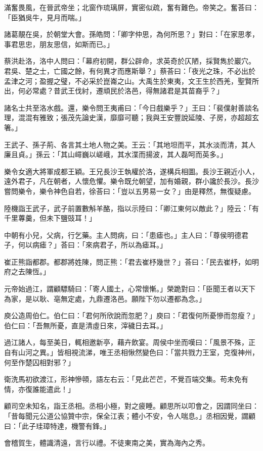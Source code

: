 滿奮畏風，在晉武帝坐；北窗作琉璃屏，實密似疏，奮有難色。帝笑之。奮荅曰：「臣猶吳牛，見月而喘。」

諸葛靚在吳，於朝堂大會。孫皓問：「卿字仲思，為何所思？」對曰：「在家思孝，事君思忠，朋友思信，如斯而已。」

蔡洪赴洛，洛中人問曰：「幕府初開，群公辟命，求英奇於仄陋，採賢雋於巖穴。君吳、楚之士，亡國之餘，有何異才而應斯舉？」蔡荅曰：「夜光之珠，不必出於孟津之河；盈握之璧，不必采於崑崙之山。大禹生於東夷，文王生於西羌，聖賢所出，何必常處？昔武王伐紂，遷頑民於洛邑，得無諸君是其苗裔乎？」

諸名士共至洛水戲。還，樂令問王夷甫曰：「今日戲樂乎？」王曰：「裴僕射善談名理，混混有雅致；張茂先論史漢，靡靡可聽；我與王安豐說延陵、子房，亦超超玄箸。」

王武子、孫子荊、各言其土地人物之美。王云：「其地坦而平，其水淡而清，其人廉且貞。」孫云：「其山嶵巍以嵯峨，其水渫而揚波，其人磊呵而英多。」

樂令女適大將軍成都王穎。王兄長沙王執權於洛，遂構兵相圖。長沙王親近小人，遠外君子，凡在朝者，人懷危懼。樂令既允朝望，加有婚親，群小讒於長沙。長沙嘗問樂令，樂令神色自若，徐荅曰：「豈以五男易一女？」由是釋然，無復疑慮。

陸機詣王武子，武子前置數斛羊酪，指以示陸曰：「卿江東何以敵此？」陸云：「有千里蓴羹，但未下鹽豉耳！」

中朝有小兒，父病，行乞藥。主人問病，曰：「患瘧也。」主人曰：「尊侯明德君子，何以病瘧？」荅曰：「來病君子，所以為瘧耳。」

崔正熊詣都郡。都郡將姓陳，問正熊：「君去崔杼幾世？」荅曰：「民去崔杼，如明府之去陳恆。」

元帝始過江，謂顧驃騎曰：「寄人國土，心常懷慚。」榮跪對曰：「臣聞王者以天下為家，是以耿、亳無定處，九鼎遷洛邑。願陛下勿以遷都為念。」

庾公造周伯仁。伯仁曰：「君何所欣說而忽肥？」庾曰：「君復何所憂慘而忽瘦？」伯仁曰：「吾無所憂，直是清虛日來，滓穢日去耳。」

過江諸人，每至美日，輒相邀新亭，藉卉飲宴。周侯中坐而嘆曰：「風景不殊，正自有山河之異。」皆相視流涕，唯王丞相愀然變色曰：「當共戮力王室，克復神州，何至作楚囚相對邪？」

衛洗馬初欲渡江，形神慘顇，語左右云：「見此芒芒，不覺百端交集。苟未免有情，亦復誰能遣此！」

顧司空未知名，詣王丞相。丞相小極，對之疲睡。顧思所以叩會之，因謂同坐曰：「昔每聞元公道公協贊中宗，保全江表；體小不安，令人喘息。」丞相因覺，謂顧曰：「此子珪璋特達，機警有鋒。」

會稽賀生，體識清遠，言行以禮。不徒東南之美，實為海內之秀。

